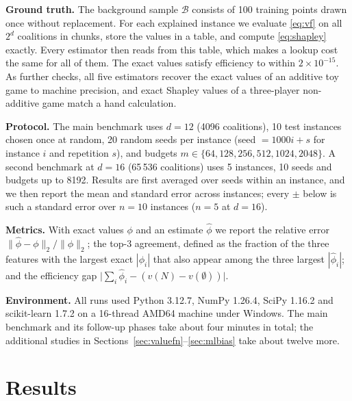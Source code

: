 \documentclass[conference]{IEEEtran}
\begin{document}
\textbf{Ground truth.} The background sample $\mathcal{B}$ consists of 100 training points drawn once without replacement. For each explained instance we evaluate \eqref{eq:vf} on all $2^d$ coalitions in chunks, store the values in a table, and compute \eqref{eq:shapley} exactly. Every estimator then reads from this table, which makes a lookup cost the same for all of them. The exact values satisfy efficiency to within $2\times10^{-15}$. As further checks, all five estimators recover the exact values of an additive toy game to machine precision, and exact Shapley values of a three-player non-additive game match a hand calculation.

\textbf{Protocol.} The main benchmark uses $d=12$ (4096 coalitions), 10 test instances chosen once at random, 20 random seeds per instance (seed $=1000i+s$ for instance $i$ and repetition $s$), and budgets $m\in\{64,128,256,512,1024,2048\}$. A second benchmark at $d=16$ (65\,536 coalitions) uses 5 instances, 10 seeds and budgets up to 8192. Results are first averaged over seeds within an instance, and we then report the mean and standard error across instances; every $\pm$ below is such a standard error over $n=10$ instances ($n=5$ at $d=16$).

\textbf{Metrics.} With exact values $\phi$ and an estimate $\hat\phi$ we report the relative error $\lVert\hat\phi-\phi\rVert_2/\lVert\phi\rVert_2$; the top-3 agreement, defined as the fraction of the three features with the largest exact $|\phi_i|$ that also appear among the three largest $|\hat\phi_i|$; and the efficiency gap $\bigl|\sum_i\hat\phi_i-(v(N)-v(\emptyset))\bigr|$.

\textbf{Environment.} All runs used Python 3.12.7, NumPy 1.26.4, SciPy 1.16.2 and scikit-learn 1.7.2 on a 16-thread AMD64 machine under Windows. The main benchmark and its follow-up phases take about four minutes in total; the additional studies in Sections~\ref{sec:valuefn}--\ref{sec:mlbias} take about twelve more.

\section{Results}
\label{sec:results}
\end{document}
